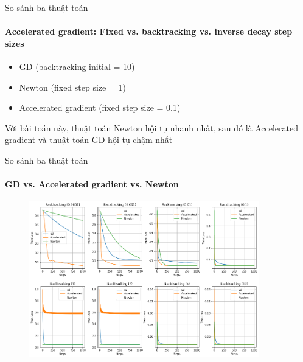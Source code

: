 \documentclass[10pt]{beamer}
\theoremstyle{remark}
\theoremstyle{definition}
\begin{document}
\begin{frame}{So sánh ba thuật toán}
	\framesubtitle{Accelerated gradient: Fixed vs. backtracking vs. inverse decay step sizes }
	\begin{itemize}
		\item GD (backtracking initial = 10)
		\item Newton (fixed step size = 1)
		\item Accelerated gradient (fixed step size = 0.1)

	\end{itemize}

	\begin{table}[]
		\centering
	\end{table}

	Với bài toán này, thuật toán Newton hội tụ nhanh nhất, sau đó là Accelerated gradient và thuật toán GD hội tụ chậm nhất
\end{frame}


\begin{frame}{So sánh ba thuật toán}
	\framesubtitle{GD vs. Accelerated gradient vs. Newton}
	\begin{figure}[h!]
		\centering
		\includegraphics[width=10cm]{Thinh/25.png}
	\end{figure}
\end{frame}
\end{document}

